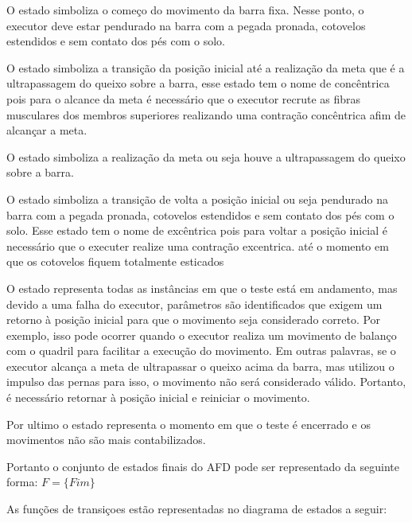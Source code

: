 O estado  simboliza o começo do movimento da barra fixa. Nesse ponto, o executor deve estar pendurado na barra com a pegada pronada, cotovelos estendidos e sem contato dos pés com o solo.

O estado  simboliza a transição da posição inicial até a realização da meta que é a ultrapassagem do queixo sobre a barra, esse estado tem o nome de concêntrica pois para o alcance da meta é necessário que o executor recrute as fibras musculares dos membros superiores  realizando  uma contração concêntrica afim de alcançar a meta.

O estado  simboliza a realização da meta ou seja houve a ultrapassagem do queixo sobre a barra.

O estado  simboliza a transição de volta a posição inicial ou seja pendurado na barra com a pegada pronada, cotovelos estendidos e sem contato dos pés com o solo. Esse estado tem o nome de excêntrica pois para voltar a posição inicial é necessário que o executer realize  uma contração excentrica. até o momento em que os cotovelos fiquem totalmente esticados

O estado  representa todas as instâncias em que o teste está em andamento, mas devido a uma falha do executor, parâmetros são identificados que exigem um retorno à posição inicial para que o movimento seja considerado correto. Por exemplo, isso pode ocorrer quando o executor realiza um movimento de balanço com o quadril para facilitar a execução do movimento. Em outras palavras, se o executor alcança a meta de ultrapassar o queixo acima da barra, mas utilizou o impulso das pernas para isso, o movimento não será considerado válido. Portanto, é necessário retornar à posição inicial e reiniciar o movimento.

Por ultimo o estado  representa o momento em que o teste é encerrado e os movimentos não são mais contabilizados.

Portanto o conjunto de estados finais do \ac{AFD} pode ser representado da seguinte forma: $F=\{Fim\}$

As funções de transiçoes estão representadas no diagrama de estados a seguir:

